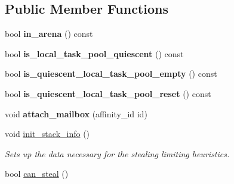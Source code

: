 \subsection*{Public Member Functions}
\begin{DoxyCompactItemize}
\item 
\hypertarget{classtbb_1_1internal_1_1generic__scheduler_a951545fe41835b1ca58bf6418aebfb69}{}bool {\bfseries in\+\_\+arena} () const \label{classtbb_1_1internal_1_1generic__scheduler_a951545fe41835b1ca58bf6418aebfb69}

\item 
\hypertarget{classtbb_1_1internal_1_1generic__scheduler_a228932018abdf86ec504ffc055bf6188}{}bool {\bfseries is\+\_\+local\+\_\+task\+\_\+pool\+\_\+quiescent} () const \label{classtbb_1_1internal_1_1generic__scheduler_a228932018abdf86ec504ffc055bf6188}

\item 
\hypertarget{classtbb_1_1internal_1_1generic__scheduler_a1b5b30c44c0a0a0d6fa6548fead0f879}{}bool {\bfseries is\+\_\+quiescent\+\_\+local\+\_\+task\+\_\+pool\+\_\+empty} () const \label{classtbb_1_1internal_1_1generic__scheduler_a1b5b30c44c0a0a0d6fa6548fead0f879}

\item 
\hypertarget{classtbb_1_1internal_1_1generic__scheduler_a41fe4dd6cf0d0bd7db3440ff1f5e70ff}{}bool {\bfseries is\+\_\+quiescent\+\_\+local\+\_\+task\+\_\+pool\+\_\+reset} () const \label{classtbb_1_1internal_1_1generic__scheduler_a41fe4dd6cf0d0bd7db3440ff1f5e70ff}

\item 
\hypertarget{classtbb_1_1internal_1_1generic__scheduler_a5ab89891d3c1e3209cffced8bf93b124}{}void {\bfseries attach\+\_\+mailbox} (affinity\+\_\+id id)\label{classtbb_1_1internal_1_1generic__scheduler_a5ab89891d3c1e3209cffced8bf93b124}

\item 
\hypertarget{classtbb_1_1internal_1_1generic__scheduler_afd799eae7903abc75b7a7aafd36e20db}{}void \hyperlink{classtbb_1_1internal_1_1generic__scheduler_afd799eae7903abc75b7a7aafd36e20db}{init\+\_\+stack\+\_\+info} ()\label{classtbb_1_1internal_1_1generic__scheduler_afd799eae7903abc75b7a7aafd36e20db}

\begin{DoxyCompactList}\small\item\em Sets up the data necessary for the stealing limiting heuristics. \end{DoxyCompactList}\item 
\hypertarget{classtbb_1_1internal_1_1generic__scheduler_a1c00f465a90ee09a240d1f81de5f635b}{}bool \hyperlink{classtbb_1_1internal_1_1generic__scheduler_a1c00f465a90ee09a240d1f81de5f635b}{can\+\_\+steal} ()\label{classtbb_1_1internal_1_1generic__scheduler_a1c00f465a90ee09a240d1f81de5f635b}


\end{DoxyCompactItemize}

